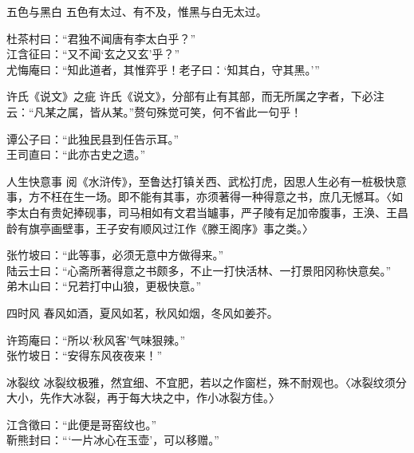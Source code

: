 \begin{yulu}{五色与黑白}
五色有太过、有不及，惟黑与白无太过。
\begin{comments}
杜茶村曰：“君独不闻唐有李太白乎？” \\
江含征曰：“又不闻‘玄之又玄’乎？” \\
尤悔庵曰：“知此道者，其惟弈乎！老子曰：‘知其白，守其黑。’”
\end{comments}
\end{yulu}

\begin{yulu}{许氏《说文》之疵}
许氏《说文》，分部有止有其部，而无所属之字者，下必注云：“凡某之属，皆从某。”赘句殊觉可笑，何不省此一句乎！
\begin{comments}
谭公子曰：“此独民县到任告示耳。” \\
王司直曰：“此亦古史之遗。”
\end{comments}
\end{yulu}

\begin{yulu}{人生快意事}
阅《水浒传》，至鲁达打镇关西、武松打虎，因思人生必有一桩极快意事，方不枉在生一场。即不能有其事，亦须著得一种得意之书，庶几无憾耳。〈如李太白有贵妃捧砚事，司马相如有文君当罏事，严子陵有足加帝腹事，王涣、王昌龄有旗亭画壁事，王子安有顺风过江作《滕王阁序》事之类。〉
\begin{comments}
张竹坡曰：“此等事，必须无意中方做得来。” \\
陆云士曰：“心斋所著得意之书颇多，不止一打快活林、一打景阳冈称快意矣。” \\
弟木山曰：“兄若打中山狼，更极快意。”
\end{comments}
\end{yulu}

\begin{yulu}{四时风}
春风如酒，夏风如茗，秋风如烟，冬风如姜芥。
\begin{comments}
许筠庵曰：“所以‘秋风客’气味狠辣。” \\
张竹坡日：“安得东风夜夜来！”
\end{comments}
\end{yulu}

\begin{yulu}{冰裂纹}
冰裂纹极雅，然宜细、不宜肥，若以之作窗栏，殊不耐观也。〈冰裂纹须分大小，先作大冰裂，再于每大块之中，作小冰裂方佳。〉
\begin{comments}
江含徵曰：“此便是哥窑纹也。” \\
靳熊封曰：“‘一片冰心在玉壶’，可以移赠。”
\end{comments}
\end{yulu}

